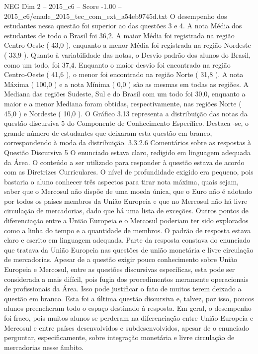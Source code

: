 \begin{textsample}{NEG Dim 2 – 2015\_c6 – Score -1.00 – 2015\_c6/enade\_2015\_tec\_com\_ext\_a54eb9745d.txt}
O desempenho dos estudantes nessa questão foi superior ao das questões 3 e 4.
A nota Média dos estudantes de todo o Brasil foi 36,2.
A maior Média foi registrada na região Centro-Oeste ( 43,0 ), enquanto a menor Média foi registrada na região Nordeste ( 33,9 ).
Quanto à variabilidade das notas, o Desvio padrão dos alunos do Brasil, como um todo, foi 37,4.
Enquanto o maior desvio foi encontrado na região Centro-Oeste ( 41,6 ), o menor foi encontrado na região Norte ( 31,8 ).
A nota Máxima ( 100,0 ) e a nota Mínima ( 0,0 ) são as mesmas em todas as regiões.
A Mediana das regiões Sudeste, Sul e do Brasil com um todo foi 30,0, enquanto a maior e a menor Mediana foram obtidas, respectivamente, nas regiões Norte ( 45,0 ) e Nordeste ( 10,0 ).
O Gráfico 3.13 representa a distribuição das notas da questão discursiva 5 do Componente de Conhecimento Específico.
Destaca -se, o grande número de estudantes que deixaram esta questão em branco, correspondendo à moda da distribuição. 3.3.2.6 Comentários sobre as respostas à Questão Discursiva 5 O enunciado estava claro, redigido em linguagem adequada da Área.
O conteúdo a ser utilizado para responder à questão estava de acordo com as Diretrizes Curriculares.
O nível de profundidade exigido era pequeno, pois bastaria o aluno conhecer três aspectos para tirar nota máxima, quais sejam, saber que o Mercosul não dispõe de uma moeda única, que o Euro não é adotado por todos os países membros da União Europeia e que no Mercosul não há livre circulação de mercadorias, dado que há uma lista de exceções.
Outros pontos de diferenciação entre a União Europeia e o Mercosul poderiam ter sido explorados como a linha do tempo e a quantidade de membros.
O padrão de resposta estava claro e escrito em linguagem adequada.
Parte da resposta constava do enunciado que tratava da União Europeia nas questões de união monetária e livre circulação de mercadorias.
Apesar de a questão exigir pouco conhecimento sobre União Europeia e Mercosul, entre as questões discursivas específicas, esta pode ser considerada a mais difícil, pois fugia dos procedimentos meramente operacionais de profissionais da Área.
Isso pode justificar o fato de muitos terem deixado a questão em branco.
Esta foi a última questão discursiva e, talvez, por isso, poucos alunos preencheram todo o espaço destinado à resposta.
Em geral, o desempenho foi fraco, pois muitos alunos se perderam na diferenciação entre União Europeia e Mercosul e entre países desenvolvidos e subdesenvolvidos, apesar de o enunciado perguntar, especificamente, sobre integração monetária e livre circulação de mercadorias nesse âmbito.

\end{textsample}
